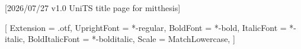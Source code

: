 %
%
%
%

[2026/07/27 v1.0 UniTS title page for mitthesis]

%
%

\usepackage{iftex}
\ifPDFTeX
	\usepackage[scaled]{helvet}
\else
	\usepackage{fontspec}
	\setsansfont{texgyreheros}[
		Extension      = .otf,
		UprightFont    = *-regular,
		BoldFont       = *-bold,
		ItalicFont     = *-italic,
		BoldItalicFont = *-bolditalic,
		Scale          = MatchLowercase,
	]
\fi



